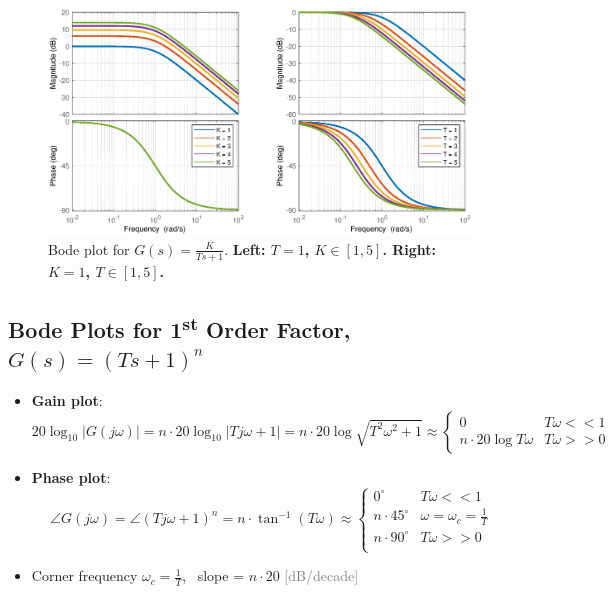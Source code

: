 \begin{itemize}
    \begin{figure}[H]
        \centering 
        \includegraphics[width=1\textwidth]{images/bode3.eps}
        \caption{Bode plot for $G(s) = \frac{K}{Ts+1}$. \textbf{Left: $T=1$, $K\in [1,5]$. Right: $K=1$, $T\in [1,5]$.}}
    \end{figure}
\end{itemize}

\subsection{Bode Plots for 1\textsuperscript{st} Order Factor, $G(s) = (Ts+1)^{n}$}
\begin{itemize}
    \item \textbf{Gain plot}:
    \[
        20\log_{10}\lvert G(j\omega) \rvert
        = n\cdot 20\log_{10} \lvert Tj\omega+1 \rvert 
        = n\cdot20\log\sqrt{T^{2}\omega^{2}+1}\approx 
        \begin{cases}
            0                       & T \omega << 1\\
            n\cdot 20\log T\omega   & T \omega >> 0
        \end{cases}
    \]
    
    \item \textbf{Phase plot}:
    \[
        \angle G(j\omega) 
        = \angle (Tj\omega+1)^{n} 
        = n\cdot \tan^{-1}(T\omega) \approx 
        \begin{cases}
            0^{\circ}           & T\omega<<1\\
            n\cdot 45^{\circ}   & \omega=\omega_{c}=\frac{1}{T}\\
            n\cdot 90^{\circ}   & T\omega>>0\\
        \end{cases}
    \]
    
    \item Corner frequency $\omega_{c} = \frac{1}{T}$, \ slope = $n\cdot 20$ \textcolor{gray}{[dB/decade]}
\end{itemize}

